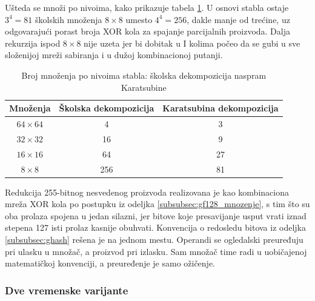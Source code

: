 Ušteda se množi po nivoima, kako prikazuje tabela \ref{tab:karatsuba_broj}. U osnovi stabla ostaje $3^4 = 81$ školskih množenja $8 \times 8$ umesto $4^4 = 256$, dakle manje od trećine, uz odgovarajući porast broja XOR kola za spajanje parcijalnih proizvoda. Dalja rekurzija ispod $8 \times 8$ nije uzeta jer bi dobitak u I kolima počeo da se gubi u sve složenijoj mreži sabiranja i u dužoj kombinacionoj putanji.

\begin{table}[H]
\caption{Broj množenja po nivoima stabla: školska dekompozicija naspram Karatsubine}
\centering
{\setlength{\tabcolsep}{8pt}\renewcommand{\arraystretch}{1.35}\small
\begin{tabular}{|c|c|c|}
\hline
\rowcolor{gray!30}
Množenja & Školska dekompozicija & Karatsubina dekompozicija \\
\hline
$64 \times 64$ & 4 & 3 \\
\hline
$32 \times 32$ & 16 & 9 \\
\hline
$16 \times 16$ & 64 & 27 \\
\hline
$8 \times 8$ & 256 & 81 \\
\hline
\end{tabular}}
\label{tab:karatsuba_broj}
\end{table}
\smallbreak
Redukcija 255-bitnog nesvedenog proizvoda realizovana je kao kombinaciona mreža XOR kola po postupku iz odeljka \ref{subsubsec:gf128_mnozenje}, s tim što su oba prolaza spojena u jedan silazni, jer bitove koje presavijanje usput vrati iznad stepena 127 isti prolaz kasnije obuhvati.
\smallbreak
Konvencija o redosledu bitova iz odeljka \ref{subsubsec:ghash} rešena je na jednom mestu. Operandi se ogledalski preuređuju pri ulasku u množač, a proizvod pri izlasku. Sam množač time radi u uobičajenoj matematičkoj konvenciji, a preuređenje je samo ožičenje.

\subsubsection{Dve vremenske varijante}
\label{subsec:hw_ghash_cycles}

